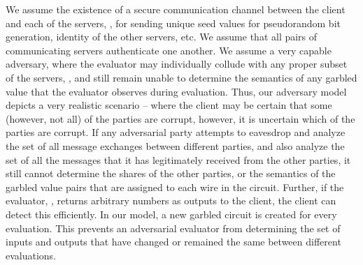 \documentclass[10pt,journal,cspaper,compsoc]{IEEEtran}
\begin{document}
We assume the existence of a secure communication channel between the client and each of the  servers, , for sending unique seed values for pseudorandom bit generation, identity of the other servers, etc. We assume that all pairs of communicating servers authenticate one another. We assume a very capable adversary, where the evaluator  may individually collude with any proper subset of the  servers, , and still remain unable to determine the semantics of any garbled value that the evaluator observes during evaluation. Thus, our adversary model depicts a very realistic scenario -- where the client may be certain that some (however, not all) of the parties are corrupt, however, it is uncertain which of the parties are corrupt. If any adversarial party attempts to eavesdrop and analyze the set of all message exchanges between different parties, and also analyze the set of all the messages that it has legitimately received from the other parties, it still cannot determine the shares of the other parties, or the semantics of the garbled value pairs that are assigned to each wire in the circuit. Further, if the evaluator, , returns arbitrary numbers as outputs to the client, the client can detect this efficiently. In our model, a new garbled circuit is created for every evaluation. This prevents an adversarial evaluator from determining the set of inputs and outputs that have changed or remained the same between different evaluations.
\end{document}
